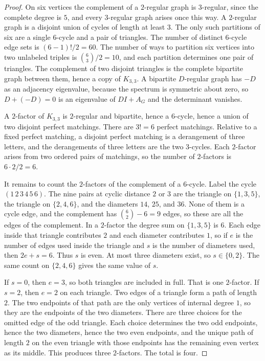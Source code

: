\documentclass[11pt]{article}
\begin{document}
\begin{proof}
On six vertices the complement of a \(2\)-regular graph is \(3\)-regular, since
the complete degree is \(5\), and every \(3\)-regular graph arises once this way.
A \(2\)-regular graph is a disjoint union of cycles of length at least \(3\).
The only such partitions of six are a single \(6\)-cycle and a pair of
triangles.
The number of distinct \(6\)-cycle edge sets is \((6-1)!/2=60\).
The number of ways to partition six vertices into two unlabeled triples is
\(\binom{6}{3}/2=10\), and each partition determines one pair of triangles.
The complement of two disjoint triangles is the complete bipartite graph
between them, hence a copy of \(K_{3,3}\).
A bipartite \(D\)-regular graph has \(-D\) as an adjacency eigenvalue, because
the spectrum is symmetric about zero, so \(D+(-D)=0\) is an eigenvalue of
\(DI+A_G\) and the determinant vanishes.

A \(2\)-factor of \(K_{3,3}\) is \(2\)-regular and bipartite, hence a \(6\)-cycle,
hence a union of two disjoint perfect matchings.
There are \(3!=6\) perfect matchings.
Relative to a fixed perfect matching, a disjoint perfect matching is a
derangement of three letters, and the derangements of three letters are the two
\(3\)-cycles.
Each \(2\)-factor arises from two ordered pairs of matchings, so the number of
\(2\)-factors is \(6\cdot 2/2=6\).

It remains to count the \(2\)-factors of the complement of a \(6\)-cycle.
Label the cycle \((1\,2\,3\,4\,5\,6)\).
The nine pairs at cyclic distance \(2\) or \(3\) are the triangle on \(\{1,3,5\}\),
the triangle on \(\{2,4,6\}\), and the diameters \(14\), \(25\), and \(36\).
None of them is a cycle edge, and the complement has \(\binom{6}{2}-6=9\) edges,
so these are all the edges of the complement.
In a \(2\)-factor the degree sum on \(\{1,3,5\}\) is \(6\).
Each edge inside that triangle contributes \(2\) and each diameter contributes
\(1\), so if \(e\) is the number of edges used inside the triangle and \(s\) is
the number of diameters used, then \(2e+s=6\).
Thus \(s\) is even.
At most three diameters exist, so \(s\in\{0,2\}\).
The same count on \(\{2,4,6\}\) gives the same value of \(s\).

If \(s=0\), then \(e=3\), so both triangles are included in full.
That is one \(2\)-factor.
If \(s=2\), then \(e=2\) on each triangle.
Two edges of a triangle form a path of length \(2\).
The two endpoints of that path are the only vertices of internal degree \(1\),
so they are the endpoints of the two diameters.
There are three choices for the omitted edge of the odd triangle.
Each choice determines the two odd endpoints, hence the two diameters, hence
the two even endpoints, and the unique path of length \(2\) on the even
triangle with those endpoints has the remaining even vertex as its middle.
This produces three \(2\)-factors.
The total is four.
\end{proof}
\end{document}
